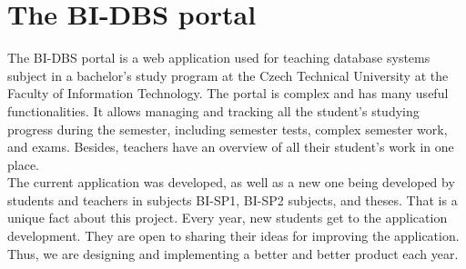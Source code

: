 \section{The BI-DBS portal}
The BI-DBS portal is a web application used for teaching database systems subject in a bachelor's study program at the Czech Technical University at the Faculty of Information Technology. The portal is complex and has many useful functionalities. It allows managing and tracking all the student's studying progress during the semester, including semester tests, complex semester work, and exams. Besides, teachers have an overview of all their student's work in one place.\\
The current application was developed, as well as a new one being developed by students and teachers in subjects BI-SP1, BI-SP2 subjects, and theses. That is a unique fact about this project. Every year, new students get to the application development. They are open to sharing their ideas for improving the application. Thus, we are designing and implementing a better and better product each year.

